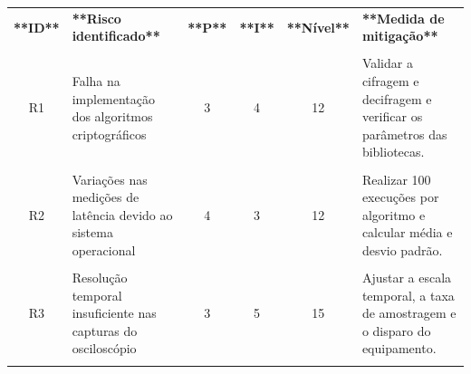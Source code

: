 \begin{quadro}[htbp]

\centering

\caption{Matriz de riscos dos experimentos criptográficos}

\label{qua:matriz_riscos}



\scriptsize

\renewcommand{\arraystretch}{1.5}

\setlength{\tabcolsep}{3pt}



\begin{tabular}{|c|p{3.1cm}|c|c|c|p{5.0cm}|}

\hline

\textbf{**ID**} &

\textbf{**Risco identificado**} &

\textbf{**P**} &

\textbf{**I**} &

\textbf{**Nível**} &

\textbf{**Medida de mitigação**} \\\\

\hline



R1 &

Falha na implementação dos algoritmos criptográficos &

3 & 4 & 12 &

Validar a cifragem e decifragem e verificar os parâmetros das bibliotecas. \\\\

\hline



R2 &

Variações nas medições de latência devido ao sistema operacional &

4 & 3 & 12 &

Realizar 100 execuções por algoritmo e calcular média e desvio padrão. \\\\

\hline



R3 &

Resolução temporal insuficiente nas capturas do osciloscópio &

3 & 5 & 15 &

Ajustar a escala temporal, a taxa de amostragem e o disparo do equipamento. \\\\


\end{tabular}
\end{quadro}
